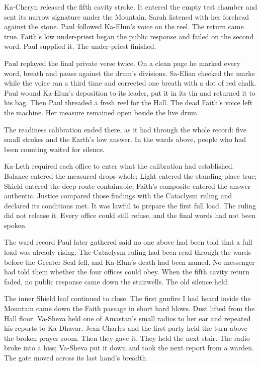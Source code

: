 Ka-Cheryn released the fifth cavity stroke. It entered the empty test chamber and sent its narrow signature under the Mountain. Sarah listened with her forehead against the stone. Paul followed Ka-Elun's voice on the reel. The return came true. Faith's low under-priest began the public response and failed on the second word. Paul supplied it. The under-priest finished.\par

Paul replayed the final private verse twice. On a clean page he marked every word, breath and pause against the drum's divisions. Sa-Elian checked the marks while the voice ran a third time and corrected one breath with a dot of red chalk. Paul wound Ka-Elun's deposition to its leader, put it in its tin and returned it to his bag. Then Paul threaded a fresh reel for the Hall. The dead Faith's voice left the machine. Her measure remained open beside the live drum.\par

The readiness calibration ended there, as it had through the whole record: five small strokes and the Earth's low answer. In the wards above, people who had been counting waited for silence.\par

Ka-Leth required each office to enter what the calibration had established. Balance entered the measured drops whole; Light entered the standing-place true; Shield entered the deep route containable; Faith's composite entered the answer authentic. Justice compared those findings with the Cataclysm ruling and declared its conditions met. It was lawful to prepare the first full load. The ruling did not release it. Every office could still refuse, and the final words had not been spoken.\par

The ward record Paul later gathered said no one above had been told that a full load was already rising. The Cataclysm ruling had been read through the wards before the Greater Seal fell, and Ka-Elun's death had been named. No messenger had told them whether the four offices could obey. When the fifth cavity return faded, no public response came down the stairwells. The old silence held.\par

The inner Shield leaf continued to close. The first gunfire I had heard inside the Mountain came down the Faith passage in short hard blows. Dust lifted from the Hall floor. Va-Sheva held one of Amastan's small radios to her ear and repeated his reports to Ka-Dhavar. Jean-Charles and the first party held the turn above the broken prayer room. Then they gave it. They held the next stair. The radio broke into a hiss; Va-Sheva put it down and took the next report from a warden. The gate moved across its last hand's breadth.\par

